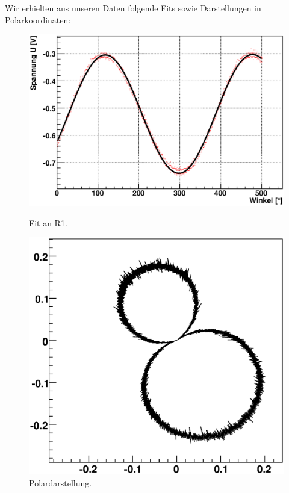 \documentclass[12pt]{article}
\begin{document}
Wir erhielten aus unseren Daten folgende Fits sowie Darstellungen in Polarkoordinaten:
\begin{figure}[H]  
\begin{minipage}{0.5\linewidth}
\centering
\includegraphics[width=0.9\linewidth]{pictures/R1.eps}
\caption{Fit an R1.}
\end{minipage}
\begin{minipage}{0.5\linewidth}
\centering 
\includegraphics[width=0.9\linewidth]{pictures/R1vd.eps}
\caption{Polardarstellung.}
\end{minipage}
\end{figure}
\end{document}

